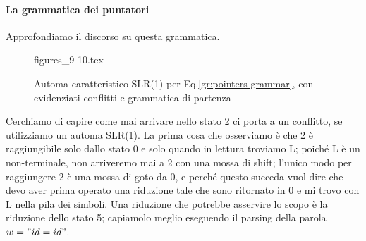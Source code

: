 \documentclass[class=book, crop=false, oneside, 12pt]{standalone}
\begin{document}
\paragraph{La grammatica dei puntatori}
Approfondiamo il discorso su questa grammatica.



\begin{figure}[H]
    \centering
	{figures_9-10.tex}
    \caption{Automa caratteristico SLR(1) per Eq.\ref{gr:pointers-grammar}, con evidenziati conflitti e grammatica di partenza}
    \label{fig:pointers-automaton-slr1-conflict}
\end{figure}
Cerchiamo di capire come mai arrivare nello stato 2 ci porta a un conflitto, se utilizziamo un automa SLR(1). La prima cosa che osserviamo è che 2 è raggiungibile solo dallo stato 0 e solo quando in lettura troviamo L; poiché L è un non-terminale, non arriveremo mai a 2 con una mossa di shift; l'unico modo per  raggiungere 2 è una mossa di goto da 0, e perché questo succeda vuol dire che devo aver prima operato una riduzione tale che sono ritornato in 0 e mi trovo con L nella pila dei simboli. Una riduzione che potrebbe asservire lo scopo è la riduzione dello stato 5; capiamolo meglio eseguendo il parsing della parola \(w = "id=id"\).
\end{document}
